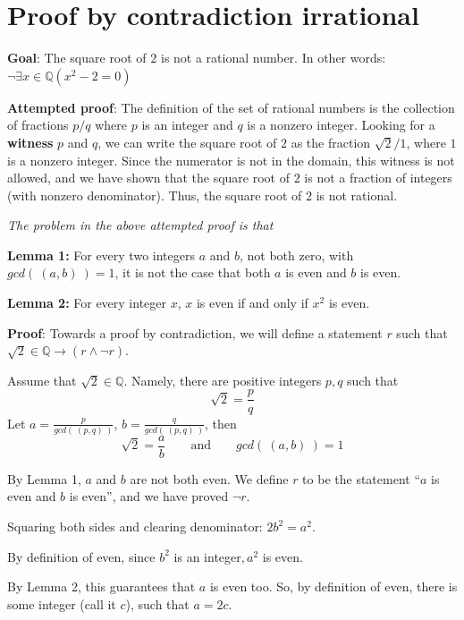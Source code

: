 \documentclass[12pt, oneside]{article}
\begin{document}
\vspace{50pt} \vfill
\section*{Proof by contradiction irrational}


{\bf Goal}:  The square root of $2$ is not a rational number.  In other words: $\neg \exists x \in \mathbb{Q} ( x^2 -  2 = 0)$

{\bf Attempted proof}: The definition of the set of rational numbers is the collection of fractions $p/q$ where $p$ is an integer and $q$ is a nonzero integer. Looking for a {\bf witness} $p$ and $q$, we can write the square root of $2$ as the fraction 
$\sqrt{2 }/1$, where $1$ is a nonzero integer. Since the numerator is not in the domain, this witness is not allowed, and we have shown that the square root of $2$ is not a fraction of integers (with nonzero denominator). Thus, the square root of $2$ is not rational.


{\it The problem in the above attempted proof is that} \underline{\phantom{it only considers one candidate witness
and does not prove that no witnesses exist.}}


{\bf Lemma 1:} For every two integers $a$ and  $b$, not both zero, with  $gcd(~(a,b)~) = 1$, it is not the case that both $a$
is  even and $b$ is even.


{\bf Lemma 2:} For every integer  $x$, $x$ is  even if and only if $x^2$  is even.


{\bf Proof}: Towards a proof by contradiction, we will define a statement 
$r$ such that $\sqrt{2} \in \mathbb{Q} \to (r \land \lnot r)$. 

Assume that $\sqrt{2} \in \mathbb{Q}$. Namely, there are positive integers
$p, q$ such that 
\[
    \sqrt{2} = \frac{p}{q}
\]
Let $a= \frac{p}{gcd( ~(p,q)~)}$, $b = \frac{q}{gcd(~(p,q)~)}$, then 
\[
    \sqrt{2} = \frac{a}{b} \qquad \text{and} \qquad gcd(~(a,b)~) = 1
\]

By Lemma 1, $a$ and $b$ are not both even. We define $r$ to be the 
statement ``$a$ is even and $b$ is even'', and we have proved $\lnot r$.

Squaring both sides and clearing denominator: $2b^2 = a^2$.

By definition of even, since $b^2$ is an integer$, a^2$ is even.

By Lemma 2, this guarantees that $a$ is even too. So, by 
definition of even, there is some integer (call it $c$), such that $a = 2c$.
\end{document}
